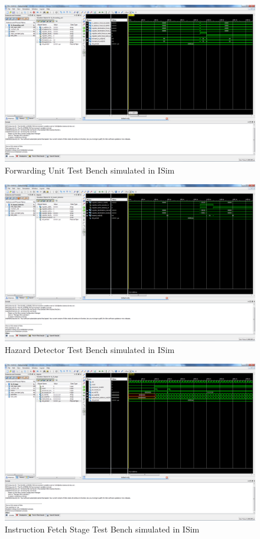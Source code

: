 \begin{figure}
    \includegraphics[width=\textwidth]{illustrations/tb_forwarding_unit.PNG}
    \caption{Forwarding Unit Test Bench simulated in ISim}
\end{figure}

\begin{figure}
    \includegraphics[width=\textwidth]{illustrations/tb_hazard_detector.PNG}
    \caption{Hazard Detector Test Bench simulated in ISim}
\end{figure}

\begin{figure}
    \includegraphics[width=\textwidth]{illustrations/tb_if_stage.PNG}
    \caption{Instruction Fetch Stage Test Bench simulated in ISim}
\end{figure}

